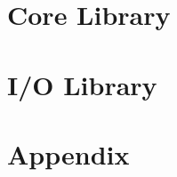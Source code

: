 \documentclass[%
  a4paper,%
  oneside,%
  12pt,%
]{article}
\begin{document}
\part{Core Library}

















\part{I/O Library}




\part{Appendix}





\end{document}
